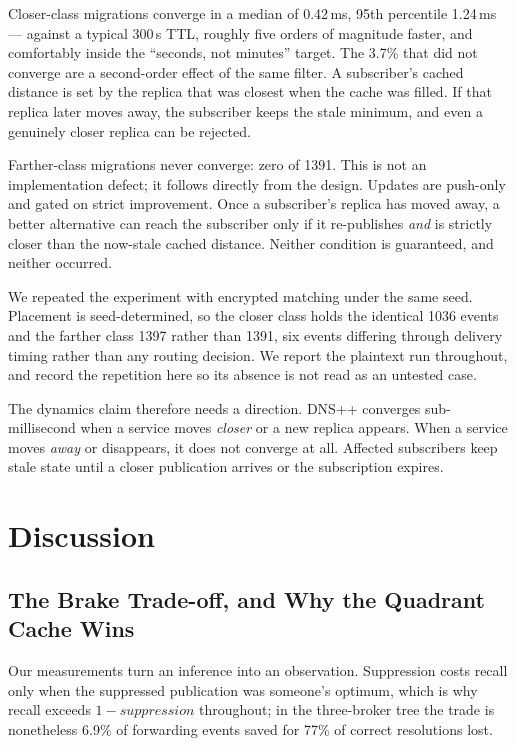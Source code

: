 \documentclass[10pt]{article}
\begin{document}
Closer-class migrations converge in a median of 0.42\,ms, 95th percentile 1.24\,ms --- against a typical 300\,s TTL, roughly five orders of magnitude faster, and comfortably inside the ``seconds, not minutes'' target. The 3.7\% that did not converge are a second-order effect of the same filter. A subscriber's cached distance is set by the replica that was closest when the cache was filled. If that replica later moves away, the subscriber keeps the stale minimum, and even a genuinely closer replica can be rejected.

Farther-class migrations never converge: zero of 1391. This is not an implementation defect; it follows directly from the design. Updates are push-only and gated on strict improvement. Once a subscriber's replica has moved away, a better alternative can reach the subscriber only if it re-publishes \emph{and} is strictly closer than the now-stale cached distance. Neither condition is guaranteed, and neither occurred.

We repeated the experiment with encrypted matching under the same seed. Placement is seed-determined, so the closer class holds the identical 1036 events and the farther class 1397 rather than 1391, six events differing through delivery timing rather than any routing decision. We report the plaintext run throughout, and record the repetition here so its absence is not read as an untested case.

The dynamics claim therefore needs a direction. DNS++ converges sub-millisecond when a service moves \emph{closer} or a new replica appears. When a service moves \emph{away} or disappears, it does not converge at all. Affected subscribers keep stale state until a closer publication arrives or the subscription expires.

\section{Discussion}
\label{sec:discussion}

\subsection{The Brake Trade-off, and Why the Quadrant Cache Wins}
\label{sec:brake-discussion}

Our measurements turn an inference into an observation. Suppression costs recall only when the suppressed publication was someone's optimum, which is why recall exceeds $1 - \textit{suppression}$ throughout; in the three-broker tree the trade is nonetheless 6.9\% of forwarding events saved for 77\% of correct resolutions lost.
\end{document}

